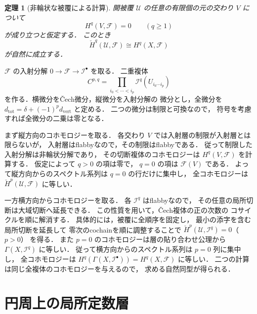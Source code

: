 \documentclass[a5paper,10pt,onecolumn]{jsarticle}
\makeatletter
\theoremstyle{mathnotetheorem}
\newtheorem{theorem}{定理}[section]
\renewcommand{\proofname}{証明}
\renewenvironment{proof}[1][\proofname]{%
  \par\pushQED{\qed}\normalfont\topsep4\p@\@plus2\p@\relax
  \trivlist\item[\hskip\labelsep\bfseries #1]\ignorespaces
}{\popQED\endtrivlist\@endpefalse}
\makeatother
\begin{document}
\begin{theorem}[非輪状な被覆による計算]\label{thm:leray}
開被覆 $\mathcal U$ の任意の有限個の元の交わり $V$ について
\[
 H^q(V,\mathcal F)=0\qquad(q\ge1)
\]
が成り立つと仮定する．
このとき
\[
 \check H^q(\mathcal U,\mathcal F)\cong H^q(X,\mathcal F)
\]
が自然に成立する．
\end{theorem}
\begin{proof}
$\mathcal F$ の入射分解
$0\to\mathcal F\to\mathcal I^\bullet$ を取る．
二重複体
\[
 C^{p,q}=
 \prod_{i_0<\cdots<i_p}
 \mathcal I^q(U_{i_0\cdots i_p})
\]
を作る．横微分を\v Cech微分，縦微分を入射分解の
微分とし，全微分を
$d_{\mathrm{tot}}=\delta+(-1)^p d_{\mathrm{vert}}$
と定める．
二つの微分は制限と可換なので，
符号を考慮すれば全微分の二乗は零となる．

まず縦方向のコホモロジーを取る．
各交わり $V$ では入射層の制限が入射層とは限らないが，
入射層はflabbyなので，その制限はflabbyである．
従って制限した入射分解は非輪状分解であり，
その切断複体のコホモロジーは
$H^q(V,\mathcal F)$ を計算する．
仮定によって $q>0$ の項は零で，
$q=0$ の項は $\mathcal F(V)$ である．
よって縦方向からのスペクトル系列は
$q=0$ の行だけに集中し，
全コホモロジーは
$\check H^p(\mathcal U,\mathcal F)$ に等しい．

一方横方向からコホモロジーを取る．
各 $\mathcal I^q$ はflabbyなので，
その任意の局所切断は大域切断へ延長できる．
この性質を用いて，\v Cech複体の正の次数の
コサイクルを順に解消する．
具体的には，被覆に全順序を固定し，
最小の添字を含む局所切断を延長して
零次のcochainを順に調整することで
$\check H^p(\mathcal U,\mathcal I^q)=0$（$p>0$）
を得る．
また $p=0$ のコホモロジーは層の貼り合わせ公理から
$\Gamma(X,\mathcal I^q)$ に等しい．
従って横方向からのスペクトル系列は
$p=0$ 列に集中し，
全コホモロジーは
$H^q(\Gamma(X,\mathcal I^\bullet))
=H^q(X,\mathcal F)$ に等しい．
二つの計算は同じ全複体のコホモロジーを与えるので，
求める自然同型が得られる．
\end{proof}

\section{円周上の局所定数層}
\end{document}
